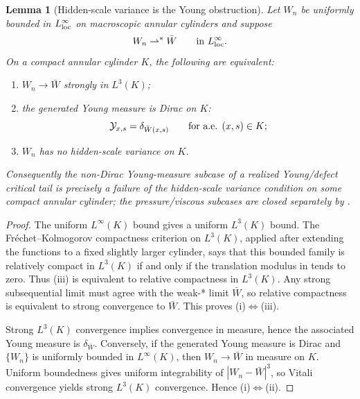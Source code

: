 \documentclass[11pt]{amsart}
\numberwithin{equation}{section}
\theoremstyle{plain}
\newtheorem{lemma}[lemma]{Lemma}
\theoremstyle{definition}
\theoremstyle{remark}
\begin{document}
\begin{lemma}[Hidden-scale variance is the Young obstruction]
\label{lem:hidden-variance-young-obstruction}
Let \(W_n\) be uniformly bounded in \(L^\infty_{\rm loc}\) on macroscopic
annular cylinders and suppose
\[
   W_n\rightharpoonup^\ast \bar W
   \qquad\hbox{in }L^\infty_{\rm loc}.
\]
On a compact annular cylinder \(K\), the following are equivalent:
\begin{enumerate}[label=\textup{(\roman*)}]
   \item \(W_n\to\bar W\) strongly in \(L^3(K)\);
   \item the generated Young measure is Dirac on \(K\):
   \[
      \mathcal Y_{x,s}=\delta_{\bar W(x,s)}
      \qquad\hbox{for a.e. }(x,s)\in K;
   \]
   \item \(W_n\) has no hidden-scale variance on \(K\).
\end{enumerate}
Consequently the non-Dirac Young-measure subcase of a realized Young/defect
critical tail is precisely a failure of the hidden-scale variance condition on
some compact annular cylinder; the pressure/viscous subcases are closed
separately by .
\end{lemma}

\begin{proof}
The uniform \(L^\infty(K)\) bound gives a uniform \(L^3(K)\) bound.  The
Fr\'echet--Kolmogorov compactness criterion on \(L^3(K)\), applied after
extending the functions to a fixed slightly larger cylinder, says that this
bounded family is relatively compact in \(L^3(K)\) if and only if the
translation modulus in  tends to zero.  Thus
\textup{(iii)} is equivalent to relative compactness in \(L^3(K)\).  Any strong
subsequential limit must agree with the weak-* limit \(\bar W\), so relative
compactness is equivalent to strong convergence to \(\bar W\).  This proves
\textup{(i)}\(\Leftrightarrow\)\textup{(iii)}.

Strong \(L^3(K)\) convergence implies convergence in measure, hence the
associated Young measure is \(\delta_{\bar W}\).  Conversely, if the generated
Young measure is Dirac and \(\{W_n\}\) is uniformly bounded in \(L^\infty(K)\),
then \(W_n\to\bar W\) in measure on \(K\).  Uniform boundedness gives uniform
integrability of \(|W_n-\bar W|^3\), so Vitali convergence yields strong
\(L^3(K)\) convergence.  Hence
\textup{(i)}\(\Leftrightarrow\)\textup{(ii)}.
\end{proof}
\end{document}

